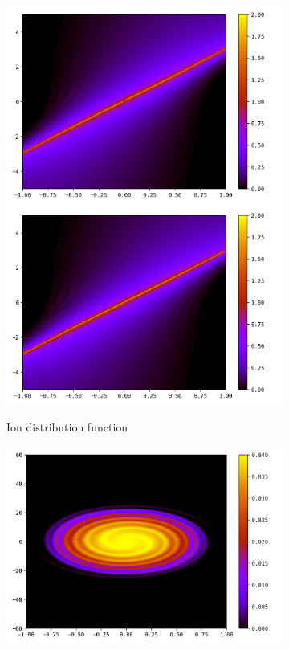 \documentclass{article}
\numberwithin{equation}{section}
\newcommand{\imh}{\textheight} %
\newcommand{\imw}{\textwidth} %
\begin{document}
\begin{figure}
	\begin{subfigure}{\textwidth}
		\centering
		\includegraphics[height=\imh,width=\imw]{images/fi_run5ab.png}
		\includegraphics[height=\imh,width=\imw]{images/fi_run5ac.png}
		\caption{Ion distribution function} 
	\end{subfigure}
	\begin{subfigure}{\textwidth}
		\centering
		\includegraphics[height=\imh,width=\imw]{images/fe_run5ab.png}

\end{subfigure}
\end{figure}
\end{document}
